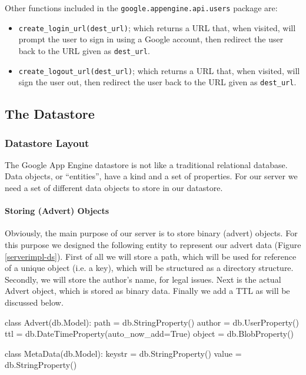 Other functions included in the \texttt{google.appengine.api.users} package are:

\begin{itemize} 
\item \texttt{create\_login\_url(dest\_url)}; which returns a URL that, when
visited, will prompt the user to sign in using a Google account, then redirect
the user back to the URL given as \texttt{dest\_url}.
\item \texttt{create\_logout\_url(dest\_url)}; which returns a URL that, when
visited, will sign the user out, then redirect the user back to the URL given as
\texttt{dest\_url}.
\end{itemize}

\subsection{The Datastore}
\subsubsection{Datastore Layout}
The Google App Engine datastore is not like a traditional relational database.
Data objects, or ``entities'', have a kind and a set of properties. For our
server we need a set of different data objects to store in our datastore.

\paragraph{Storing (Advert) Objects}
Obviously, the main purpose of our server is to store binary (advert) objects.
For this purpose we designed the following entity to represent our advert data
(Figure \ref{serverimpl-ds}). First of all we will store a path, which will be
used for reference of a unique object (i.e. a key), which will be structured as a
directory structure. Secondly, we will store the author's name, for legal issues.
Next is the actual Advert object, which is stored as binary data. Finally we add
a TTL as will be discussed below.

\begin{figure*}[ht] %
\begin{center}
\begin{code}
class Advert(db.Model):
  path   = db.StringProperty()
  author = db.UserProperty()
  ttl    = db.DateTimeProperty(auto_now_add=True)
  object = db.BlobProperty()
  
class MetaData(db.Model):
  keystr = db.StringProperty()
  value  = db.StringProperty()
\end{code}
\caption{An Advert Object.\label{serverimpl-ds}}
\end{center}
\end{figure*}

